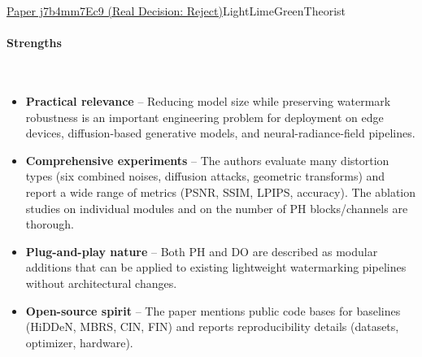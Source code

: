 \documentclass{article} %
\begin{document}
\begin{reviewbox}{\href{https://openreview.net/forum?id=j7b4mm7Ec9}{Paper j7b4mm7Ec9 (Real Decision: Reject)}}{LightLimeGreen}{Theorist}
\paragraph{Strengths}
\leavevmode\\[0.1em]
\begin{itemize}[leftmargin=0.5em, itemsep=0pt, topsep=0pt]
    \item \textbf{Practical relevance} – Reducing model size while preserving watermark robustness is an important engineering problem for deployment on edge devices, diffusion-based generative models, and neural-radiance-field pipelines.
    \item \textbf{Comprehensive experiments} – The authors evaluate many distortion types (six combined noises, diffusion attacks, geometric transforms) and report a wide range of metrics (PSNR, SSIM, LPIPS, accuracy). The ablation studies on individual modules and on the number of PH blocks/channels are thorough.
    \item \textbf{Plug-and-play nature} – Both PH and DO are described as modular additions that can be applied to existing lightweight watermarking pipelines without architectural changes.
    \item \textbf{Open-source spirit} – The paper mentions public code bases for baselines (HiDDeN, MBRS, CIN, FIN) and reports reproducibility details (datasets, optimizer, hardware).
\end{itemize}


\end{reviewbox}
\end{document}
